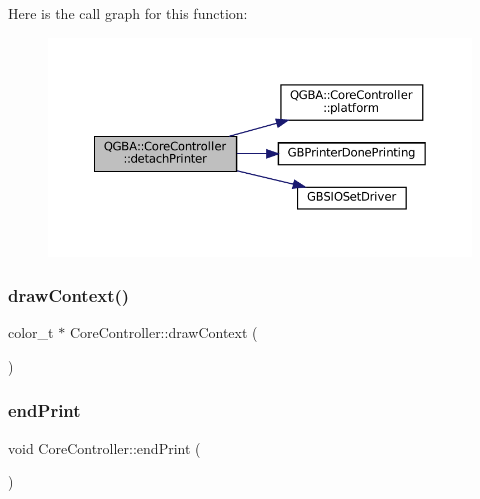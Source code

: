 Here is the call graph for this function\+:
\nopagebreak
\begin{figure}[H]
\begin{center}
\leavevmode
\includegraphics[width=350pt]{class_q_g_b_a_1_1_core_controller_a0cafa561225bd09a8629308589130f68_cgraph}
\end{center}
\end{figure}
\mbox{\label{class_q_g_b_a_1_1_core_controller_a75b38518510f7aa4ba69bfe4a2a6552b}} 
\subsubsection{\texorpdfstring{draw\+Context()}{drawContext()}}
{\footnotesize\ttfamily color\+\_\+t $\ast$ Core\+Controller\+::draw\+Context (\begin{DoxyParamCaption}{ }\end{DoxyParamCaption})}

\mbox{\label{class_q_g_b_a_1_1_core_controller_a387b03d053fb40544d02ac1e58e59c0d}} 
\subsubsection{\texorpdfstring{end\+Print}{endPrint}}
{\footnotesize\ttfamily void Core\+Controller\+::end\+Print (\begin{DoxyParamCaption}{ }\end{DoxyParamCaption})\hspace{0.3cm}{\ttfamily [slot]}}


